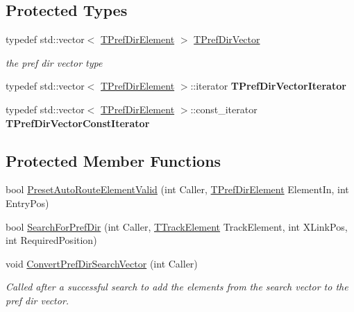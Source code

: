 \subsection*{Protected Types}
\begin{DoxyCompactItemize}
\item 
\mbox{\label{class_t_one_pref_dir_a7162736e4bbe36fbac7a57ce395fcd14}} 
typedef std\+::vector$<$ \mbox{\hyperlink{class_t_pref_dir_element}{T\+Pref\+Dir\+Element}} $>$ \mbox{\hyperlink{class_t_one_pref_dir_a7162736e4bbe36fbac7a57ce395fcd14}{T\+Pref\+Dir\+Vector}}
\begin{DoxyCompactList}\small\item\em the pref dir vector type \end{DoxyCompactList}\item 
\mbox{\label{class_t_one_pref_dir_a8a905cfdce2439be93d45b66339b7382}} 
typedef std\+::vector$<$ \mbox{\hyperlink{class_t_pref_dir_element}{T\+Pref\+Dir\+Element}} $>$\+::iterator {\bfseries T\+Pref\+Dir\+Vector\+Iterator}
\item 
\mbox{\label{class_t_one_pref_dir_a53624ed7b429b42aa57cfe5551f5df71}} 
typedef std\+::vector$<$ \mbox{\hyperlink{class_t_pref_dir_element}{T\+Pref\+Dir\+Element}} $>$\+::const\+\_\+iterator {\bfseries T\+Pref\+Dir\+Vector\+Const\+Iterator}
\end{DoxyCompactItemize}
\subsection*{Protected Member Functions}
\begin{DoxyCompactItemize}
\item 
bool \mbox{\hyperlink{class_t_one_pref_dir_ab35c683ba0ec156d19d4db991046b7d2}{Preset\+Auto\+Route\+Element\+Valid}} (int Caller, \mbox{\hyperlink{class_t_pref_dir_element}{T\+Pref\+Dir\+Element}} Element\+In, int Entry\+Pos)
\item 
bool \mbox{\hyperlink{class_t_one_pref_dir_a82c6a19d67ada7059491afae05ced4a4}{Search\+For\+Pref\+Dir}} (int Caller, \mbox{\hyperlink{class_t_track_element}{T\+Track\+Element}} Track\+Element, int X\+Link\+Pos, int Required\+Position)
\item 
\mbox{\label{class_t_one_pref_dir_a482d1c69a674eec4db0190b78659c495}} 
void \mbox{\hyperlink{class_t_one_pref_dir_a482d1c69a674eec4db0190b78659c495}{Convert\+Pref\+Dir\+Search\+Vector}} (int Caller)
\begin{DoxyCompactList}\small\item\em Called after a successful search to add the elements from the search vector to the pref dir vector. \end{DoxyCompactList}\end{DoxyCompactItemize}
